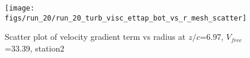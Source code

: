 \begin{figure}[H]
\centering
\texttt{[image: figs/run\_20/run\_20\_turb\_visc\_ettap\_bot\_vs\_r\_mesh\_scatter]}
\caption{Scatter plot of velocity gradient term vs radius at $z/c$=6.97, $V_{free}$=33.39, station2}
\label{fig:run_20_turb_visc_ettap_bot_vs_r_mesh_scatter}
\end{figure}


